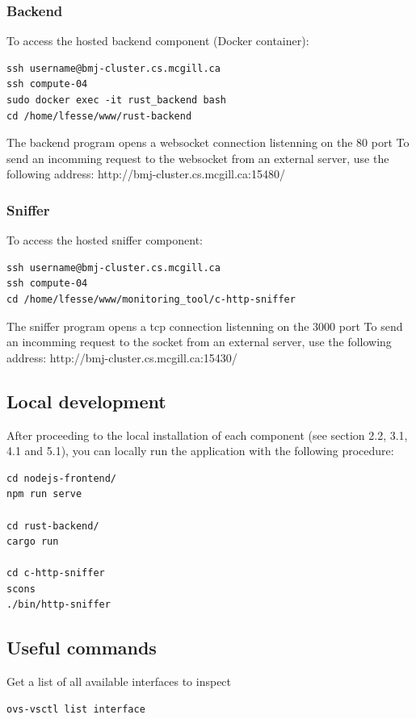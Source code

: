 \documentclass[12pt,hidelinks]{article}
\begin{document}
\subsubsection{Backend}
To access the hosted backend component (Docker container):
\begin{verbatim}
ssh username@bmj-cluster.cs.mcgill.ca
ssh compute-04
sudo docker exec -it rust_backend bash
cd /home/lfesse/www/rust-backend
\end{verbatim}

    The backend program opens a websocket connection listenning on the 80 port
    To send an incomming request to the websocket from an external server, use the following address: http://bmj-cluster.cs.mcgill.ca:15480/

\subsubsection{Sniffer}
To access the hosted sniffer component: 
    \begin{verbatim}
ssh username@bmj-cluster.cs.mcgill.ca
ssh compute-04
cd /home/lfesse/www/monitoring_tool/c-http-sniffer 	
\end{verbatim}

   
    The sniffer program opens a tcp connection listenning on the 3000 port
    To send an incomming request to the socket from an external server, use the following address: http://bmj-cluster.cs.mcgill.ca:15430/

\subsection{Local development}

After proceeding to the local installation of each component (see section 2.2, 3.1, 4.1 and 5.1), you can locally run the application with the following procedure:
\begin{verbatim}
cd nodejs-frontend/
npm run serve

cd rust-backend/
cargo run

cd c-http-sniffer
scons
./bin/http-sniffer

\end{verbatim}

	
\subsection{Useful commands}
Get a list of all available interfaces to inspect
\begin{verbatim}
ovs-vsctl list interface  
\end{verbatim}
\end{document}
